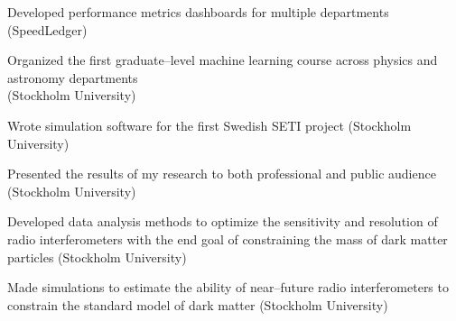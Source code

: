 \begin{cvitems}
    \item \small{Developed performance metrics dashboards for
      multiple departments (SpeedLedger)}

    \item \small{Organized the first graduate--level machine learning
      course across physics and astronomy departments \\
      (Stockholm University)}

    \item \small{Wrote simulation software for the first Swedish SETI
      project (Stockholm University)}

    \item \small{Presented the results of my research to both
      professional and public audience (Stockholm University)}

    \item \small{Developed data analysis methods to optimize the
      sensitivity and resolution of radio interferometers with the end
      goal of constraining the mass of dark matter particles (Stockholm University)}

    \item \small{Made simulations to estimate the ability of
      near--future radio interferometers to constrain the standard
      model of dark matter (Stockholm University)}





  \end{cvitems}
